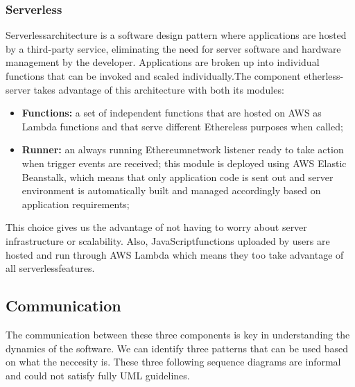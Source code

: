 \subsubsection{Serverless}
Serverless\glo architecture is a software design pattern where applications are hosted by a third-party service, eliminating the need for server software and hardware management by the developer. Applications are broken up into individual functions that can be invoked and scaled individually.\newline\newline The component etherless-server takes advantage of this architecture with both its modules:
\begin{itemize}
	\item \textbf{Functions:} a set of independent functions that are hosted on AWS as Lambda functions and that serve different Ethereless purposes when called;
	\item \textbf{Runner:} an always running Ethereum\glo network listener ready to take action when trigger events are received; this module is deployed using AWS Elastic Beanstalk, which means that only application code is sent out and server environment is automatically built and managed accordingly based on application requirements;
\end{itemize}
This choice gives us the advantage of not having to worry about server infrastructure or scalability.
Also, JavaScript\glo functions uploaded by users are hosted and run through AWS Lambda which means they too take advantage of all serverless\glo features.
\newpage
\subsection{Communication}
The communication between these three components is key in understanding the dynamics of the software. We can identify three patterns that can be used based on what the neccesity is.
These three following sequence diagrams are informal and could not satisfy fully UML guidelines.
